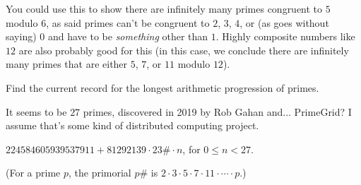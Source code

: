 \documentclass[../main.tex]{subfiles}
\begin{document}
You could use this to show there are infinitely many primes congruent to $5$ modulo $6$, as said primes can't be congruent to $2$, $3$, $4$, or (as goes without saying) $0$ and have to be \emph{something} other than $1$. Highly composite numbers like $12$ are also probably good for this (in this case, we conclude there are infinitely many primes that are either $5$, $7$, or $11$ modulo $12$).



\begin{ex} \label{2.40}
  Find the current record for the longest arithmetic progression of primes.
\end{ex}

It seems to be $27$ primes, discovered in 2019 by Rob Gahan and... PrimeGrid? I assume that's some kind of distributed computing project.

$224584605939537911 + 81292139 \cdot 23\# \cdot n$, for $0 \leq n < 27$.

(For a prime $p$, the primorial $p\#$ is $2 \cdot 3 \cdot 5 \cdot 7 \cdot 11 \cdot \cdots \cdot p$.)
\end{document}
